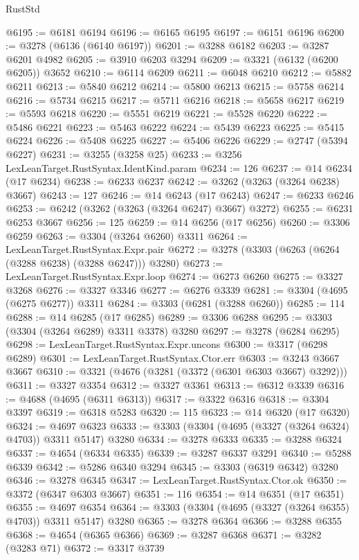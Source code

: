 \begin{lexlean}{RustStd}
\begin{coremodule}
@6195 := @6181 @6194
@6196 := @6165 @6195
@6197 := @6151 @6196
@6200 := @3278 (@6136 (@6140 @6197))
@6201 := @3288 @6182
@6203 := @3287 @6201 @4982
@6205 := @3910 @6203 @3294
@6209 := @3321 (@6132 (@6200 @6205)) @3652
@6210 := @6114 @6209
@6211 := @6048 @6210
@6212 := @5882 @6211
@6213 := @5840 @6212
@6214 := @5800 @6213
@6215 := @5758 @6214
@6216 := @5734 @6215
@6217 := @5711 @6216
@6218 := @5658 @6217
@6219 := @5593 @6218
@6220 := @5551 @6219
@6221 := @5528 @6220
@6222 := @5486 @6221
@6223 := @5463 @6222
@6224 := @5439 @6223
@6225 := @5415 @6224
@6226 := @5408 @6225
@6227 := @5406 @6226
@6229 := @2747 (@5394 @6227)
@6231 := @3255 (@3258 @25)
@6233 := @3256 LexLeanTarget.RustSyntax.IdentKind.param
@6234 := 126
@6237 := @14 @6234 (@17 @6234)
@6238 := @6233 @6237
@6242 := @3262 (@3263 (@3264 @6238) @3667)
@6243 := 127
@6246 := @14 @6243 (@17 @6243)
@6247 := @6233 @6246
@6253 := @6242 (@3262 (@3263 (@3264 @6247) @3667) @3272)
@6255 := @6231 @6253 @3667
@6256 := 125
@6259 := @14 @6256 (@17 @6256)
@6260 := @3306 @6259
@6263 := @3304 (@3264 @6260) @3311
@6264 := LexLeanTarget.RustSyntax.Expr.pair
@6272 := @3278 (@3303 (@6263 (@6264 (@3288 @6238) (@3288 @6247))) @3280)
@6273 := LexLeanTarget.RustSyntax.Expr.loop
@6274 := @6273 @6260
@6275 := @3327 @3268
@6276 := @3327 @3346
@6277 := @6276 @3339
@6281 := @3304 (@4695 (@6275 @6277)) @3311
@6284 := @3303 (@6281 (@3288 @6260))
@6285 := 114
@6288 := @14 @6285 (@17 @6285)
@6289 := @3306 @6288
@6295 := @3303 (@3304 (@3264 @6289) @3311 @3378) @3280
@6297 := @3278 (@6284 @6295)
@6298 := LexLeanTarget.RustSyntax.Expr.uncons
@6300 := @3317 (@6298 @6289)
@6301 := LexLeanTarget.RustSyntax.Ctor.err
@6303 := @3243 @3667 @3667
@6310 := @3321 (@4676 (@3281 (@3372 (@6301 @6303 @3667) @3292)))
@6311 := @3327 @3354
@6312 := @3327 @3361
@6313 := @6312 @3339
@6316 := @4688 (@4695 (@6311 @6313))
@6317 := @3322 @6316
@6318 := @3304 @3397
@6319 := @6318 @5283
@6320 := 115
@6323 := @14 @6320 (@17 @6320)
@6324 := @4697 @6323
@6333 := @3303 (@3304 (@4695 (@3327 (@3264 @6324) @4703)) @3311 @5147) @3280
@6334 := @3278 @6333
@6335 := @3288 @6324
@6337 := @4654 (@6334 @6335)
@6339 := @3287 @6337 @3291
@6340 := @5288 @6339
@6342 := @5286 @6340 @3294
@6345 := @3303 (@6319 @6342) @3280
@6346 := @3278 @6345
@6347 := LexLeanTarget.RustSyntax.Ctor.ok
@6350 := @3372 (@6347 @6303 @3667)
@6351 := 116
@6354 := @14 @6351 (@17 @6351)
@6355 := @4697 @6354
@6364 := @3303 (@3304 (@4695 (@3327 (@3264 @6355) @4703)) @3311 @5147) @3280
@6365 := @3278 @6364
@6366 := @3288 @6355
@6368 := @4654 (@6365 @6366)
@6369 := @3287 @6368
@6371 := @3282 (@3283 @71)
@6372 := @3317 @3739

\end{coremodule}
\end{lexlean}
